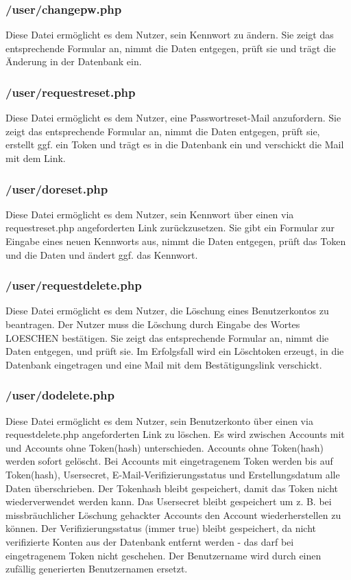 \subsubsection{/user/changepw.php}
Diese Datei ermöglicht es dem Nutzer, sein Kennwort zu ändern.
Sie zeigt das entsprechende Formular an, nimmt die Daten entgegen, prüft sie und trägt die Änderung in der Datenbank ein.

\subsubsection{/user/requestreset.php}
Diese Datei ermöglicht es dem Nutzer, eine Passwortreset-Mail anzufordern.
Sie zeigt das entsprechende Formular an, nimmt die Daten entgegen, prüft sie, erstellt ggf. ein Token und trägt es in die Datenbank ein und verschickt die Mail mit dem Link.

\subsubsection{/user/doreset.php}
Diese Datei ermöglicht es dem Nutzer, sein Kennwort über einen via requestreset.php angeforderten Link zurückzusetzen.
Sie gibt ein Formular zur Eingabe eines neuen Kennworts aus, nimmt die Daten entgegen, prüft das Token und die Daten und ändert ggf. das Kennwort.

\subsubsection{/user/requestdelete.php}
Diese Datei ermöglicht es dem Nutzer, die Löschung eines Benutzerkontos zu beantragen.
Der Nutzer muss die Löschung durch Eingabe des Wortes LOESCHEN bestätigen.
Sie zeigt das entsprechende Formular an, nimmt die Daten entgegen, und prüft sie.
Im Erfolgsfall wird ein Löschtoken erzeugt, in die Datenbank eingetragen und eine Mail mit dem Bestätigungslink verschickt.

\subsubsection{/user/dodelete.php}
Diese Datei ermöglicht es dem Nutzer, sein Benutzerkonto über einen via requestdelete.php angeforderten Link zu löschen.
Es wird zwischen Accounts mit und Accounts ohne Token(hash) unterschieden. Accounts ohne Token(hash) werden sofort gelöscht.
Bei Accounts mit eingetragenem Token werden bis auf Token(hash), Usersecret, E-Mail-Verifizierungsstatus und Erstellungsdatum
alle Daten überschrieben.
Der Tokenhash bleibt gespeichert, damit das Token nicht wiederverwendet werden kann.
Das Usersecret bleibt gespeichert um z. B. bei missbräuchlicher Löschung gehackter Accounts den Account wiederherstellen zu können.
Der Verifizierungsstatus (immer true) bleibt gespeichert, da nicht verifizierte Konten aus der Datenbank entfernt werden - das darf bei eingetragenem Token nicht geschehen.
Der Benutzername wird durch einen zufällig generierten Benutzernamen ersetzt.

